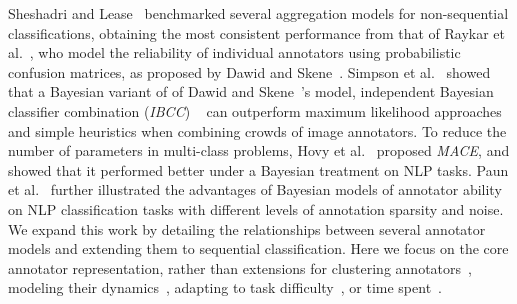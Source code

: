 Sheshadri and Lease~ benchmarked several 
aggregation models for non-sequential classifications, 
obtaining the most consistent performance from 
that of Raykar et al.~, who
model the reliability of individual annotators
using probabilistic confusion matrices,
as proposed by Dawid and Skene~.
Simpson et al.~ showed that a Bayesian variant of of Dawid and Skene~'s model, independent Bayesian classifier combination
(\emph{IBCC}) ~\cite{kim2012bayesian} 
can outperform maximum likelihood approaches and simple heuristics
when combining crowds of image annotators.
To reduce the number of parameters in multi-class problems,
Hovy et al.~ proposed \emph{MACE}, 
and showed that it performed better under a Bayesian treatment on NLP tasks.
Paun et al.~ further illustrated
the advantages of Bayesian models of annotator ability on NLP classification tasks
with different levels of annotation sparsity and noise.
We expand this work by detailing the relationships between several annotator models
and extending them to sequential classification. 
Here we focus on the core annotator representation, rather than extensions 
for clustering annotators~\cite{venanzi2014community,moreno_bayesian_2015},
modeling their dynamics~\cite{simpsonlong},
adapting to task difficulty~\cite{whitehill2009whose,bachrach2012grade},
or time spent~\cite{venanzi2016time}.

